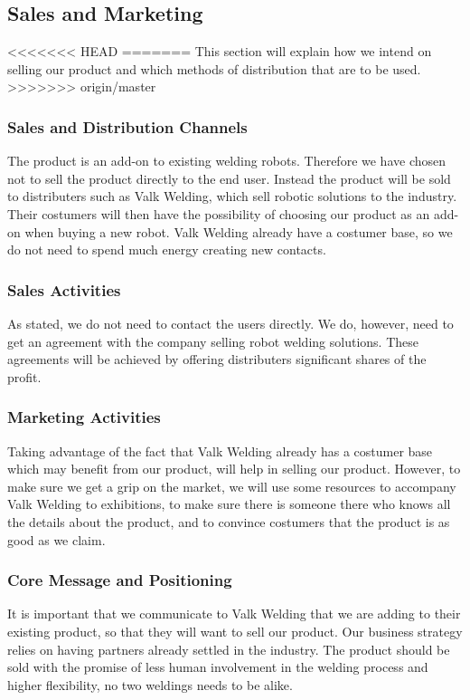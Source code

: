 \subsection{Sales and Marketing}
<<<<<<< HEAD
=======
This section will explain how we intend on selling our product and which methods of distribution that are to be used.
>>>>>>> origin/master
\subsubsection{Sales and Distribution Channels}
The product is an add-on to existing welding robots. Therefore we have chosen not to sell the product directly to the end user. 
Instead the product will be sold to distributers such as Valk Welding, which sell robotic solutions to the industry. 
Their costumers will then have the possibility of choosing our product as an add-on when buying a new robot.
Valk Welding already have a costumer base, so we do not need to spend much energy creating new contacts. 
\subsubsection{Sales Activities}
As stated, we do not need to contact the users directly. 
We do, however, need to get an agreement with the company selling robot welding solutions.
These agreements will be achieved by offering distributers significant shares of the profit.
\subsubsection{Marketing Activities}
Taking advantage of the fact that Valk Welding already has a costumer base which may benefit from our product, will help in selling our product.
However, to make sure we get a grip on the market, we will use some resources to accompany Valk Welding to exhibitions, to make sure there is someone there who knows all the details about the product, and to convince costumers that the product is as good as we claim. 
\subsubsection{Core Message and Positioning}
It is important that we communicate to Valk Welding that we are adding to their existing product, so that they will want to sell our product. Our business strategy relies on having partners already settled in the industry.
The product should be sold with the promise of less human involvement in the welding process and higher flexibility, no two weldings needs to be alike.
